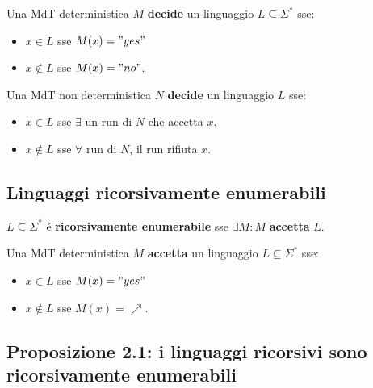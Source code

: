 Una MdT deterministica $M$ \textbf{decide} un linguaggio $L \subseteq \Sigma^*$ sse:
\begin{itemize}
	\item $x \in L$ sse $M(x) = "yes"$
	\item $x \notin L$ sse $M(x) = "no"$.
\end{itemize}

Una MdT non deterministica $N$ \textbf{decide} un linguaggio $L$ sse:
\begin{itemize}
	\item $x \in L$ sse $\exists$ un run di $N$ che accetta $x$.
	\item $x \notin L$ sse $\forall$ run di $N$, il run rifiuta $x$.
\end{itemize}


\subsection{Linguaggi ricorsivamente enumerabili}
$L \subseteq \Sigma^*$ é \textbf{ricorsivamente enumerabile} sse $\exists M : M$ \textbf{accetta} $L$.

Una MdT deterministica $M$ \textbf{accetta} un linguaggio $L \subseteq \Sigma^*$ sse:
\begin{itemize}
	\item $x \in L$ sse $M(x) = "yes"$
	\item $x \notin L$ sse $M(x) = \nearrow$.
\end{itemize}


\subsection{Proposizione 2.1: i linguaggi ricorsivi sono ricorsivamente enumerabili}

